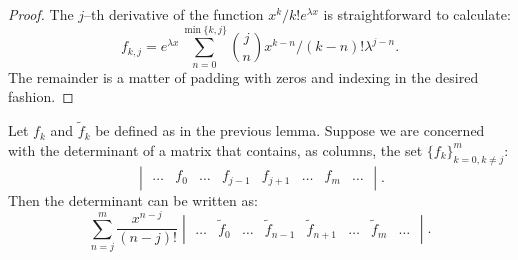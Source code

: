 \documentclass{book}
\begin{document}
\begin{proof}
The $j$--th derivative of the function $x^k/k! e^{\lambda x}$ is straightforward to calculate:
\begin{equation*}
f_{k,j} = e^{\lambda x} \sum_{n=0}^{\min\{k,j\}} \binom{j}{n}
x^{k-n}/(k-n)! \lambda^{j-n} .
\end{equation*}
The remainder is a matter of padding with zeros and indexing in the desired fashion.
\end{proof}

\begin{lemma}
Let $f_k$ and $\tilde{f}_k$ be defined as in the previous lemma.
Suppose we are concerned with the determinant of a matrix that contains, as columns, the set $\{f_k\}_{k=0, k \neq j}^m$:
\begin{equation*}
\begin{vmatrix} \dots & f_0 & \dots & f_{j-1} & f_{j+1} & \dots & f_m & \dots \end{vmatrix} .
\end{equation*}
Then the determinant can be written as:
\begin{equation*}
\sum_{n=j}^m \frac{x^{n-j}}{(n-j)!} \begin{vmatrix} \dots & \tilde{f}_0 & \dots & \tilde{f}_{n-1} & \tilde{f}_{n+1} & \dots & \tilde{f}_m & \dots \end{vmatrix} .
\end{equation*}
\label{lem:key}
\end{lemma}
\end{document}
